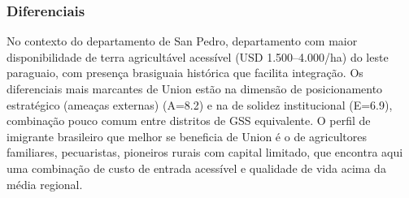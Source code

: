 \subsubsection*{Diferenciais}\label{dif-union-0211}
No contexto do departamento de San Pedro, departamento com maior disponibilidade de terra agricultável acessível (USD 1.500–4.000/ha) do leste paraguaio, com presença brasiguaia histórica que facilita integração. Os diferenciais mais marcantes de Union estão na dimensão de posicionamento estratégico (ameaças externas) (A=8.2) e na de solidez institucional (E=6.9), combinação pouco comum entre distritos de GSS equivalente. O perfil de imigrante brasileiro que melhor se beneficia de Union é o de agricultores familiares, pecuaristas, pioneiros rurais com capital limitado, que encontra aqui uma combinação de custo de entrada acessível e qualidade de vida acima da média regional.
